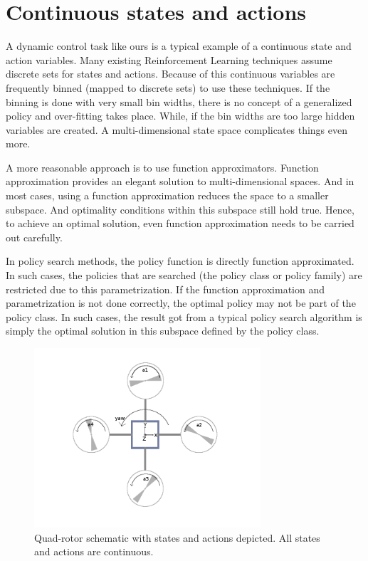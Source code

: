 \documentclass[hidelinks,BTech]{iitmdiss}
\begin{document}
\section{Continuous states and actions}

A dynamic control task like ours is a typical example of a continuous state and action variables. Many existing Reinforcement Learning techniques assume discrete sets for states and actions. Because of this continuous variables are frequently binned (mapped to discrete sets) to use these techniques. If the binning is done with very small bin widths, there is no concept of a generalized policy and over-fitting takes place. While, if the bin widths are too large hidden variables are created. A multi-dimensional state space complicates things even more.

A more reasonable approach is to use function approximators. Function approximation provides an elegant solution to multi-dimensional spaces. And in most cases, using a function approximation reduces the space to a smaller subspace. And optimality conditions within this subspace still hold true. Hence, to achieve an optimal solution, even function approximation needs to be carried out carefully.

In policy search methods, the policy function is directly function approximated. In such cases, the policies that are searched (the policy class or policy family) are restricted due to this parametrization. If the function approximation and parametrization is not done correctly, the optimal policy may not be part of the policy class. In such cases, the result got from a typical policy search algorithm is simply the optimal solution in this subspace defined by the policy class.

\begin{figure}[H]
  \centering
    \includegraphics[width=0.75\textwidth]{quadrotor_states_actions.png}
    \caption{Quad-rotor schematic with states and actions depicted. All states and actions are continuous.}
\end{figure}
\end{document}
